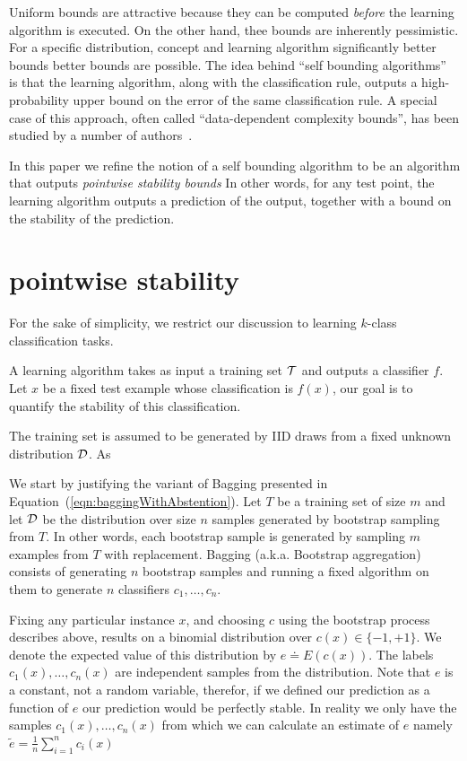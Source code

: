 \documentclass{article}
\begin{document}
Uniform bounds are attractive because they can be computed {\em
  before} the learning algorithm is executed. On
the other hand, thee bounds are inherently pessimistic. For a specific
distribution, concept and learning algorithm significantly better
bounds better bounds are possible. The idea behind ``self bounding
algorithms''~\cite{freund1998self} is that the learning algorithm,
along with the classification rule, outputs a high-probability upper
bound on the error of the same classification rule. A special case of this approach,
often called ``data-dependent complexity bounds'', has been studied by
a number of authors~\cite{}.

In this paper we refine the notion of a self bounding
algorithm to be an algorithm that outputs {\em pointwise stability
bounds} In other words, for any test point, the learning algorithm
outputs a prediction of the output, together with a bound on the
stability of the prediction. 

\section{pointwise stability}

For the sake of simplicity, we restrict our discussion to learning
$k$-class classification tasks.

A learning algorithm takes as input a training set ${\cal T}$ and 
outputs a classifier $f$. Let $x$ be a fixed test example whose
classification is $f(x)$, our goal is to quantify the stability of
this classification.

The training set is assumed to be generated by IID draws from a fixed
unknown distribution ${\cal D}$.  As 


We start by justifying the variant of Bagging presented in
Equation~(\ref{eqn:baggingWithAbstention}). Let $T$ be a training set
of size $m$ and let ${\cal D}$ be the distribution over size $n$ samples
generated by bootstrap sampling from $T$. In other words, each
bootstrap sample is generated by sampling $m$ examples from $T$ with
replacement. Bagging (a.k.a. Bootstrap aggregation) consists of
generating $n$ bootstrap samples and running a fixed algorithm on them
to generate $n$ classifiers $c_1,\ldots,c_n$.

\newcommand{\te}{\tilde{e}}

Fixing any particular instance $x$, and choosing $c$ using the
bootstrap process describes above, results on a binomial distribution
over $c(x) \in \{-1,+1\}$. We denote the expected value of this distribution
by $e \doteq E\left( c(x) \right)$. The labels
$c_1(x),\ldots,c_n(x)$ are independent samples from the distribution.
Note that $e$ is a constant, not a random variable, therefor, if we
defined our prediction as a function of $e$ our prediction would be
perfectly stable. In reality we only
have the samples $c_1(x),\ldots,c_n(x)$ from which we can calculate
an estimate of $e$ namely $\te = \frac{1}{n} \sum_{i=1}^n c_i(x)$
\end{document}
